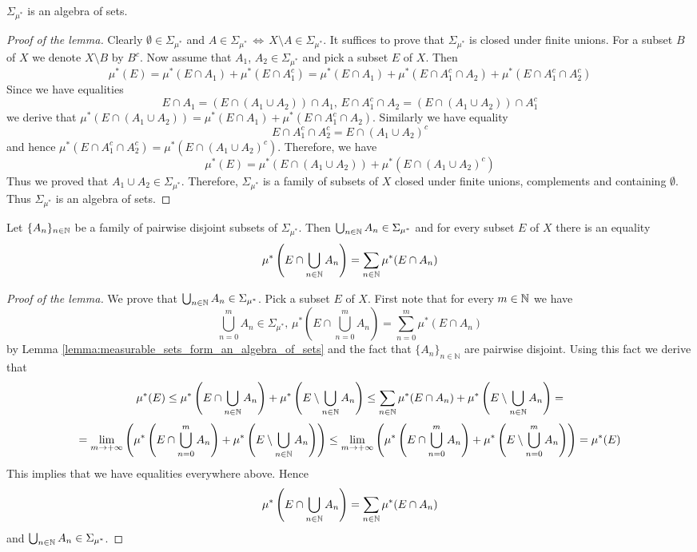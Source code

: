 \begin{lemma}\label{lemma:measurable_sets_form_an_algebra_of_sets}
$\Sigma_{\mu^*}$ is an algebra of sets.
\end{lemma}
\begin{proof}[Proof of the lemma]
Clearly $\emptyset \in \Sigma_{\mu^*}$ and $A\in \Sigma_{\mu^*}\,\Leftrightarrow\,X\setminus A\in \Sigma_{\mu^*}$. It suffices to prove that $\Sigma_{\mu^*}$ is closed under finite unions. For a subset $B$ of $X$ we denote $X\setminus B$ by $B^c$. Now assume that $A_1$, $A_2\in \Sigma_{\mu^*}$ and pick a subset $E$ of $X$. Then
$$\mu^*(E)=\mu^*(E\cap A_1)+\mu^*(E\cap A_1^c)=\mu^*(E\cap A_1)+\mu^*(E\cap A_1^c\cap A_2)+\mu^*(E\cap A_1^c\cap A_2^c)$$
Since we have equalities
$$E\cap A_1=\left(E\cap (A_1\cup A_2)\right)\cap A_1,\,E\cap A_1^c\cap A_2=\left(E\cap (A_1\cup A_2)\right)\cap A_1^c$$
we derive that $\mu^*(E\cap (A_1\cup A_2))=\mu^*(E\cap A_1)+\mu^*(E\cap A_1^c\cap A_2)$. Similarly we have equality 
$$E\cap A_1^c\cap A_2^c=E\cap (A_1\cup A_2)^c$$
and hence $\mu^*(E\cap A_1^c\cap A_2^c)=\mu^*(E\cap (A_1\cup A_2)^c)$. Therefore, we have 
$$\mu^*(E)=\mu^*(E\cap (A_1\cup A_2))+\mu^*(E\cap (A_1\cup A_2)^c)$$
Thus we proved that $A_1\cup A_2\in \Sigma_{\mu^*}$. Therefore, $\Sigma_{\mu^*}$ is a family of subsets of $X$ closed under finite unions, complements and containing $\emptyset$. Thus $\Sigma_{\mu^*}$ is an algebra of sets.
\end{proof}

\begin{lemma}\label{lemma:measurable_sets_form_sigma_algebra_and_outer_measure_respects_countable_disjoint_union_of_subsets}
Let $\{A_n\}_{n\in {\mathbb N}}$ be a family of pairwise disjoint subsets of $\Sigma_{\mu^*}$. Then $\bigcup_{n\in {\mathbb N}}A_n\in \Sigma_{\mu^*}$ and for every subset $E$ of $X$ there is an equality
$$\mu^*\left(E\cap \bigcup_{n\in {\mathbb N}}A_n\right)=\sum_{n\in {\mathbb N}}\mu^*(E\cap A_n)$$
\end{lemma}
\begin{proof}[Proof of the lemma]
We prove that $\bigcup_{n\in {\mathbb N}}A_n\in \Sigma_{\mu^*}$. Pick a subset $E$ of $X$. First note that for every $m\in {\mathbb N}$ we have
$$\bigcup_{n=0}^mA_n\in \Sigma_{\mu^*},\,\mu^*\left(E\cap \bigcup_{n=0}^mA_n\right) = \sum_{n=0}^m\mu^*(E\cap A_n)$$
by Lemma \ref{lemma:measurable_sets_form_an_algebra_of_sets} and the fact that $\{A_n\}_{n\in \mathbb{N}}$ are pairwise disjoint. Using this fact we derive that
$$\mu^*(E) \leq \mu^*\left(E\cap \bigcup_{n\in {\mathbb N}}A_n\right)+\mu^*\left(E\setminus \bigcup_{n\in {\mathbb N}}A_n\right) \leq  \sum_{n\in {\mathbb N}}\mu^*(E\cap A_n)+\mu^*\left(E\setminus \bigcup_{n\in {\mathbb N}}A_n\right) =$$
$$= \lim_{m\rightarrow +\infty}\left(\mu^*\left(E\cap \bigcup_{n=0}^mA_n\right)+\mu^*\left(E\setminus \bigcup_{n\in {\mathbb N}}A_n\right)\right)\leq \lim_{m\rightarrow +\infty}\left(\mu^*\left(E\cap \bigcup_{n=0}^mA_n\right)+\mu^*\left(E\setminus \bigcup_{n=0}^{m}A_n\right)\right) = \mu^*(E)$$
This implies that we have equalities everywhere above. Hence
$$\mu^*\left(E\cap \bigcup_{n\in {\mathbb N}}A_n\right)= \sum_{n\in {\mathbb N}}\mu^*(E\cap A_n)$$
and $\bigcup_{n\in {\mathbb N}}A_n\in \Sigma_{\mu^*}$.
\end{proof}

